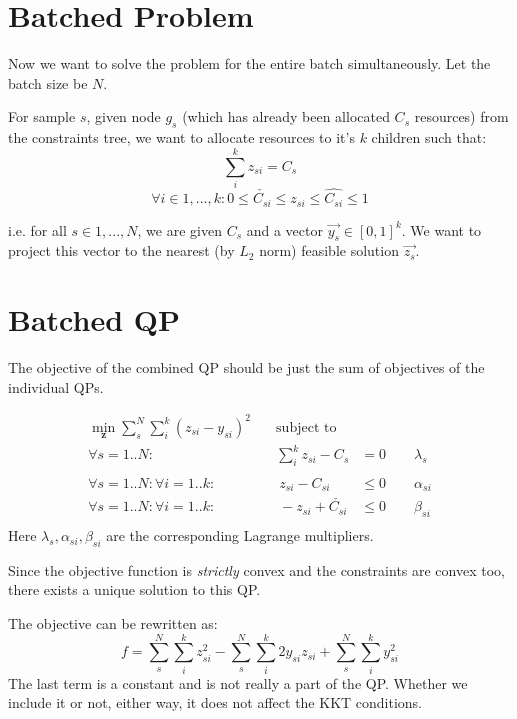 \documentclass[11 pt]{article}
\begin{document}
\section{Batched Problem}

Now we want to solve the problem for the entire batch simultaneously. Let the batch size be $N$.

For sample $s$, given node $g_s$ (which has already been allocated $C_s$ resources) from the constraints tree, we want to allocate resources to it's $k$ children such that:
\[\sum_i^k z_{si} = C_s \]
\[\forall i \in {1,...,k} : 0 \le \check{C_{si}} \le z_{si} \le \hat{C_{si}} \le 1\]

i.e. for all $s \in {1,...,N}$, we are given $C_s$ and a vector $\vec{y_s} \in [0, 1]^k$. We want to project this vector to the nearest (by $L_2$ norm) feasible solution $\vec{z_s}$.


\section{Batched QP}

The objective of the combined QP should be just the sum of objectives of the individual QPs.

\begin{equation} \label{batch_qp}
    \begin{aligned}
        \underset{\bm{z}}{\min} \sum_s^N \sum_i^k (z_{si} - y_{si})^2 \quad &\text{subject to} \\
        \forall s=1..N: & \sum_i^k z_{si} - C_s &= 0                   \qquad \lambda_s\\
        \forall s=1..N: \forall i=1..k : & \ z_{si} - \hat{C_{si}} &\le 0      \qquad \alpha_{si}\\
        \forall s=1..N: \forall i=1..k : & \ -z_{si} + \check{C_{si}} &\le 0      \qquad \beta_{si}\\
    \end{aligned}
\end{equation}
Here $\lambda_s,\alpha_{si}, \beta_{si}$ are the corresponding Lagrange multipliers.

Since the objective function is \textit{strictly} convex and the constraints are convex too, there exists a unique solution to this QP.

The objective can be rewritten as:
\[f = \sum_s^N \sum_i^k z_{si}^2 - \sum_s^N \sum_i^k 2 y_{si} z_{si} + \sum_s^N \sum_i^k y_{si}^2\]
The last term is a constant and is not really a part of the QP. Whether we include it or not, either way, it does not affect the KKT conditions.
\end{document}
